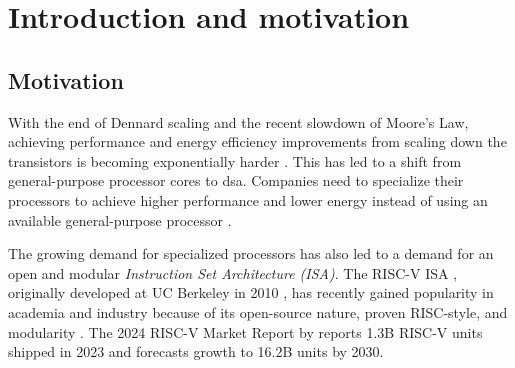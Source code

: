 
\chapter{Introduction and motivation}
\label{Introduction} 





\section{Motivation}


With the end of Dennard scaling and the recent slowdown of Moore's Law, achieving performance and energy efficiency improvements from scaling down the transistors is becoming exponentially harder \cite{hennessyComputerArchitectureQuantitative2019}. This has led to a shift from general-purpose processor cores to \acrfull{dsa}. Companies need to specialize their processors to achieve higher performance and lower energy instead of using an available general-purpose processor \cite{mezgerSurveyRISCVArchitecture2022}. 


The growing demand for specialized processors has also led to a demand for an open and modular \textit{Instruction Set Architecture (ISA)}. The RISC-V ISA \cite{watermanRISCVInstructionSet2019,watermanRISCVInstructionSet2021}, originally developed at UC Berkeley in 2010 \cite{pattersonComputerOrganizationDesign2021}, has recently gained popularity in academia and industry because of its open-source nature, proven RISC-style, and modularity \cite{theshdgroupRISCVMarketReport2024, asanovicInstructionSetsShould2014}.
The 2024 RISC-V Market Report by \textcite{theshdgroupRISCVMarketReport2024} reports 1.3B RISC-V units shipped in 2023 and forecasts growth to 16.2B units by 2030.


